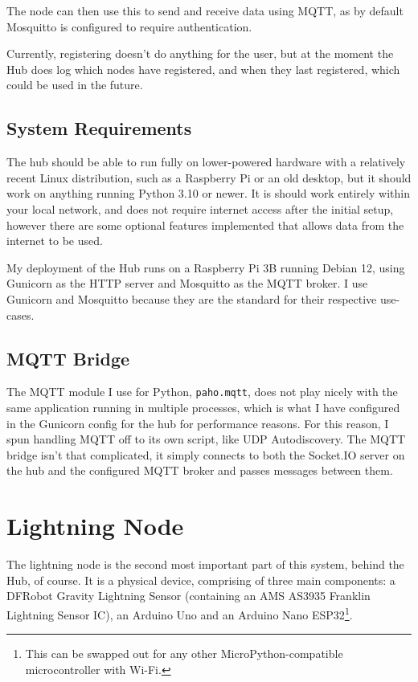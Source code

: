 The node can then use this to send and receive data using MQTT, as by default Mosquitto is configured to require authentication.

Currently, registering doesn't do anything for the user, but at the moment the Hub does log which nodes have registered, and when they last registered, which could be used in the future.

\subsection{System Requirements}

The hub should be able to run fully on lower-powered hardware with a relatively recent Linux distribution, such as a Raspberry Pi or an old desktop, but it should work on anything running Python 3.10 or newer. It is should work entirely within your local network, and does not require internet access after the initial setup, however there are some optional features implemented that allows data from the internet to be used. 

My deployment of the Hub runs on a Raspberry Pi 3B running Debian 12, using Gunicorn as the HTTP server and Mosquitto as the MQTT broker. I use Gunicorn and Mosquitto because they are the standard for their respective use-cases.

\subsection{MQTT Bridge}
\label{chap:mqtt}
The MQTT module I use for Python, \texttt{paho.mqtt}, does not play nicely with the same application running in multiple processes, which is what I have configured in the Gunicorn config for the hub for performance reasons. For this reason, I spun handling MQTT off to its own script, like UDP Autodiscovery. The MQTT bridge isn't that complicated, it simply connects to both the Socket.IO server on the hub and the configured MQTT broker and passes messages between them. 

\section{Lightning Node}
\label{chap:lightningsensor}
The lightning node is the second most important part of this system, behind the Hub, of course. It is a physical device, comprising of three main components: a DFRobot Gravity Lightning Sensor (containing an AMS AS3935 Franklin Lightning Sensor IC), an Arduino Uno and an Arduino Nano ESP32\footnote{This can be swapped out for any other MicroPython-compatible microcontroller with Wi-Fi.}. 

